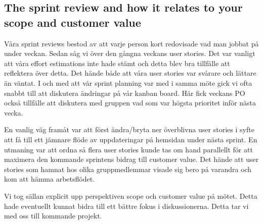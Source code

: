 \documentclass{scrartcl}
\begin{document}

\subsection{The sprint review and how it relates to your scope and customer value}





Våra sprint reviews bestod av att varje person kort redovisade vad man jobbat på under veckan. Sedan såg vi över den gångna veckans user stories. Det var vanligt att våra effort estimations inte hade stämt och detta blev bra tillfälle att reflektera över detta. Det hände både att våra user stories var svårare och lättare än väntat. I och med att vår sprint planning var med i samma möte gick vi ofta snabbt till att diskutera ändringar på vår kanban board. Här fick veckans PO också tillfälle att diskutera med gruppen vad som var högsta prioritet inför nästa vecka. 

En vanlig väg framåt var att först ändra/bryta ner överblivna user stories i syfte att få till ett jämnare flöde av uppdateringar på hemsidan under nästa sprint. En utmaning var att ordna så flera user stories kunde tas om hand parallellt för att maximera den kommande sprintens bidrag till customer value. Det hände att user stories som hamnat hos olika gruppmedlemmar visade sig bero på varandra och kom att hämma arbetsflödet. 

Vi tog sällan explicit upp perspektiven scope och customer value på mötet. Detta hade eventuellt kunnat bidra till ett bättre fokus i diskussionerna. Detta tar vi med oss till kommande projekt.


\end{document}
